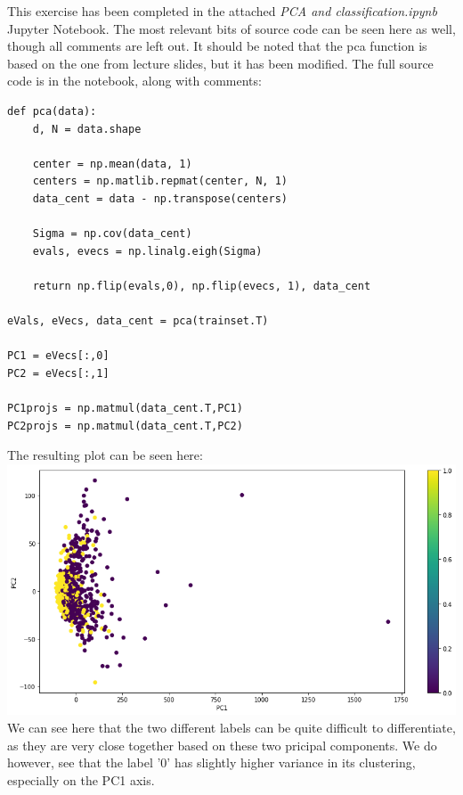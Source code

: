 This exercise has been completed in the attached \textit{PCA and classification.ipynb} Jupyter Notebook. The most relevant bits of source code can be seen here as well, though all comments are left out. It should be noted that the pca function is based on the one from lecture slides, but it has been modified. The full source code is in the notebook, along with comments:
\begin{verbatim}
def pca(data):
    d, N = data.shape

    center = np.mean(data, 1)
    centers = np.matlib.repmat(center, N, 1)
    data_cent = data - np.transpose(centers)
    
    Sigma = np.cov(data_cent)
    evals, evecs = np.linalg.eigh(Sigma)
    
    return np.flip(evals,0), np.flip(evecs, 1), data_cent

eVals, eVecs, data_cent = pca(trainset.T)

PC1 = eVecs[:,0]
PC2 = eVecs[:,1]

PC1projs = np.matmul(data_cent.T,PC1)
PC2projs = np.matmul(data_cent.T,PC2)
\end{verbatim}
The resulting plot can be seen here:\\
\includegraphics[width=\linewidth]{5a1.png}
We can see here that the two different labels can be quite difficult to differentiate, as they are very close together based on these two pricipal components. We do however, see that the label '0' has slightly higher variance in its clustering, especially on the PC1 axis.